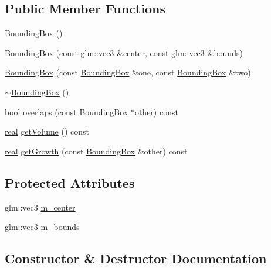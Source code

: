 \subsection*{Public Member Functions}
\begin{DoxyCompactItemize}
\item 
\mbox{\hyperlink{classrum_1_1_bounding_box_ab8fc622a27065c0bfe9e9f3d057c900e}{Bounding\+Box}} ()
\item 
\mbox{\hyperlink{classrum_1_1_bounding_box_a60123b8bafc7fa4ef78cdf2a4c49eac3}{Bounding\+Box}} (const glm\+::vec3 \&center, const glm\+::vec3 \&bounds)
\item 
\mbox{\hyperlink{classrum_1_1_bounding_box_a68f722c0cc72e5c939fa1fa382b26330}{Bounding\+Box}} (const \mbox{\hyperlink{classrum_1_1_bounding_box}{Bounding\+Box}} \&one, const \mbox{\hyperlink{classrum_1_1_bounding_box}{Bounding\+Box}} \&two)
\item 
\mbox{\hyperlink{classrum_1_1_bounding_box_a515a617dd779ad1932598f0bb6bd9669}{$\sim$\+Bounding\+Box}} ()
\item 
bool \mbox{\hyperlink{classrum_1_1_bounding_box_a798ccec9c372ac1591c9b8b386998784}{overlaps}} (const \mbox{\hyperlink{classrum_1_1_bounding_box}{Bounding\+Box}} $\ast$other) const
\item 
\mbox{\hyperlink{namespacerum_a7e8cca23573d5eaead0f138cbaa4862c}{real}} \mbox{\hyperlink{classrum_1_1_bounding_box_a4a41c20aaf5e75fa695b92ab2a7c178b}{get\+Volume}} () const
\item 
\mbox{\hyperlink{namespacerum_a7e8cca23573d5eaead0f138cbaa4862c}{real}} \mbox{\hyperlink{classrum_1_1_bounding_box_a17b3182994f8b113be3aee8063563ea9}{get\+Growth}} (const \mbox{\hyperlink{classrum_1_1_bounding_box}{Bounding\+Box}} \&other) const
\end{DoxyCompactItemize}
\subsection*{Protected Attributes}
\begin{DoxyCompactItemize}
\item 
glm\+::vec3 \mbox{\hyperlink{classrum_1_1_bounding_box_af9c7a5df5b02f646a1aa0d5cf0c4e1fd}{m\+\_\+center}}
\item 
glm\+::vec3 \mbox{\hyperlink{classrum_1_1_bounding_box_a676df9315a0bf21962b02c65cb765a3a}{m\+\_\+bounds}}
\end{DoxyCompactItemize}


\subsection{Constructor \& Destructor Documentation}
\mbox{\label{classrum_1_1_bounding_box_ab8fc622a27065c0bfe9e9f3d057c900e}} 
